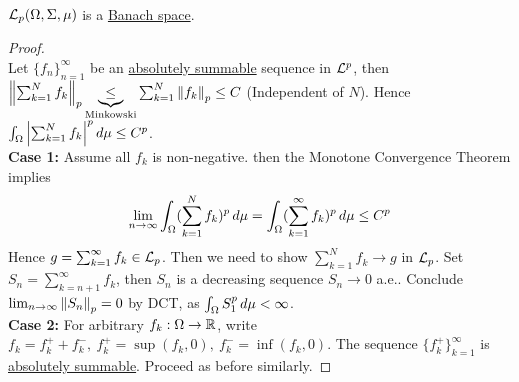 \vspace{3pt}
\begin{theorem}\ \\
$\mathcal{L}_p(\Omega, \Sigma, \mu)$ is a \underline{Banach space}.
\end{theorem}
\begin{proof}\ \\
Let $\{f_n\}_{n = 1}^\infty$ be an \underline{absolutely summable} sequence in $\mathcal{L}^p$, then $\norm{\sum_{k = 1}^N f_k}_p \underbrace{\leq}_{\text{Minkowski}} \sum_{k = 1}^N \norm{f_k}_p \leq C $ (Independent of $N$). Hence $\int_\Omega \abs{\sum_{k=1}^N f_k}^p \,d\mu \leq C^p$.\\
\textbf{Case 1:} Assume all $f_k$ is non-negative. then the Monotone Convergence Theorem implies
$$\lim_{n \to \infty} \int_\Omega (\sum_{k=1}^N f_k)^p \,d\mu = \int_\Omega (\sum_{k=1}^\infty f_k)^p \,d\mu \leq C^p$$
Hence $g = \sum_{k=1}^\infty f_k \in \mathcal{L}_p$. Then we need to show $\sum_{k=1}^N f_k \to g$ in $\mathcal{L}_p$. Set $S_n = \sum_{k = n + 1}^\infty f_k$, then $S_n$ is a decreasing sequence $S_n \to 0$ a.e.. Conclude $\lim_{n \to \infty} \norm{S_n}_p = 0$ by DCT, as $\int_\Omega S_1^p \,d\mu < \infty$.\\
\textbf{Case 2:} For arbitrary $f_k: \Omega \to \mathbb{R}$, write $f_k = f_k^+ + f_k^-,\ f_k^+ = \sup{(f_k, 0)},\ f_k^- = \inf(f_k, 0)$. The sequence $\{f_k^+\}_{k = 1}^\infty$ is \underline{absolutely summable}. Proceed as before similarly.
\end{proof}